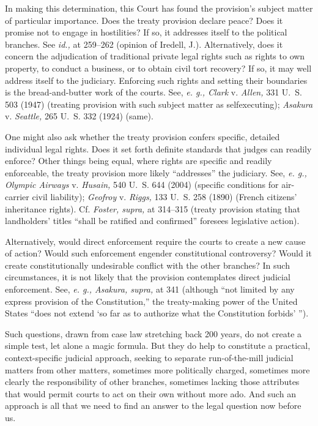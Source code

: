 {{  In making this determination, this Court has found the provision's
subject matter of particular importance. Does \newpage  the treaty
provision declare peace? Does it promise not to engage in hostilities?
If so, it addresses itself to the political branches. See \emph{id.,} at
259--262 (opinion of Iredell, J.). Alternatively, does it concern the
adjudication of traditional private legal rights such as rights to own
property, to conduct a business, or to obtain civil tort recovery? If
so, it may well address itself to the judiciary. Enforcing such rights
and setting their boundaries is the bread-and-butter work of the courts.
See, \emph{e. g., Clark} v. \emph{Allen,} 331 U.~S. 503 (1947) (treating
provision with such subject matter as selfexecuting); \emph{Asakura} v.
\emph{Seattle,} 265 U.~S. 332 (1924) (same).

  One might also ask whether the treaty provision confers specific,
detailed individual legal rights. Does it set forth definite standards
that judges can readily enforce? Other things being equal, where rights
are specific and readily enforceable, the treaty provision more likely
``addresses'' the judiciary. See, \emph{e. g., Olympic Airways} v.
\emph{Husain,} 540 U.~S. 644 (2004) (specific conditions for air-carrier
civil liability); \emph{Geofroy} v. \emph{Riggs,} 133 U.~S. 258 (1890)
(French citizens' inheritance rights). Cf. \emph{Foster, supra,} at
314--315 (treaty provision stating that landholders' titles ``shall
be ratified and confirmed'' foresees legislative action).

  Alternatively, would direct enforcement require the courts to create
a new cause of action? Would such enforcement engender constitutional
controversy? Would it create constitutionally undesirable conflict
with the other branches? In such circumstances, it is not likely that
the provision contemplates direct judicial enforcement. See, \emph{e.
g., Asakura, supra,} at 341 (although ``not limited by any express
provision of the Constitution,'' the treaty-making power of the
United States ``does not extend ‘so far as to authorize what the
Constitution forbids' '').

  Such questions, drawn from case law stretching back 200 years, do
not create a simple test, let alone a magic formula. But they do
help to constitute a practical, context-specific judicial approach,
seeking to separate run-of-the-mill judicial \newpage  matters from other
matters, sometimes more politically charged, sometimes more clearly the
responsibility of other branches, sometimes lacking those attributes
that would permit courts to act on their own without more ado. And such
an approach is all that we need to find an answer to the legal question
now before us.

}}
